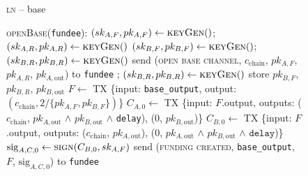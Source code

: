 \begin{figure}[H]
  \begin{processbox}{\textsc{ln} -- base}
    \begin{algorithmic}[1]
      \State \textsc{openBase}(\texttt{fundee}):
      \Indent
        \State $(sk_{A, F}, pk_{A, F}) \gets \textsc{keyGen}()$;
        $(sk_{A, R}, pk_{A, R}) \gets \textsc{keyGen}()$
          \State $(sk_{B, F}, pk_{B, F}) \gets \textsc{keyGen}()$; $(sk_{B, R},
          pk_{B, R}) \gets \textsc{keyGen}()$
        \Else \: 
          \State send (\textsc{open base channel}, $c_{\mathrm{chain}}$, $pk_{A,
          F}$, $pk_{A, R}$, $pk_{A, \mathrm{out}}$) to \texttt{fundee}
          \State {}
          \State {}
          \State {}
          \State {};
          $(sk_{B, R}, pk_{B, R}) \gets \textsc{keyGen}()$
          \State {}
          \State store $pk_{B, F}$, $pk_{B, R}$, $pk_{B, \mathrm{out}}$
        \EndIf
        \State $F \gets$ TX \{input: \texttt{base\_output}, output:
        $(c_{\mathrm{chain}}, 2/\{pk_{A, F}, pk_{B, F}\})$\}
          \State $C_{A, 0} \gets$ TX \{input: $F$.output, outputs:
          ($c_{\mathrm{chain}}$, $pk_{A, \mathrm{out}}$ $\wedge$ $pk_{B,
          \mathrm{out}}$ $\wedge$ \texttt{delay}), ($0$, $pk_{B,
          \mathrm{out}}$)\}
          \State $C_{B, 0} \gets$ TX \{input: $F$.output, outputs:
          ($c_{\mathrm{chain}}$, $pk_{A, \mathrm{out}}$), ($0$, $pk_{A,
          \mathrm{out}}$ $\wedge$ $pk_{B, \mathrm{out}}$ $\wedge$
          $\texttt{delay}$)\}
          \State $\mathrm{sig}_{A, C, 0} \gets \textsc{sign}(C_{B, 0}, sk_{A,
          F})$
          \State send (\textsc{funding created}, \texttt{base\_output},
          $F$, $\mathrm{sig}_{A, C, 0}$) to \texttt{fundee}
          \State {}
          \State {}
          \State {}
\end{algorithmic}
\end{processbox}
\end{figure}
